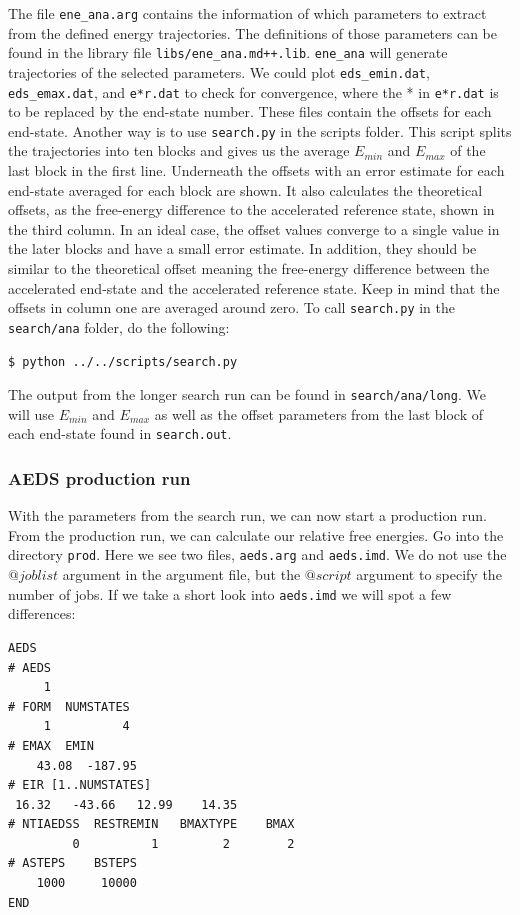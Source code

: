 The file \texttt{ene\_ana.arg} contains the information of which parameters to extract from the defined energy trajectories. The definitions of those parameters can be found in the library file \texttt{libs/ene\_ana.md++.lib}. \texttt{ene\_ana} will generate trajectories of the selected parameters. We could plot \texttt{eds\_emin.dat}, \texttt{eds\_emax.dat}, and \texttt{e*r.dat} to check for convergence, where the * in \texttt{e*r.dat} is to be replaced by the end-state number. These files contain the offsets for each end-state. Another way is to use \texttt{search.py} in the scripts folder. This script splits the trajectories into ten blocks and gives us the average $E_{min}$ and $E_{max}$ of the last block in the first line. Underneath the offsets with an error estimate for each end-state averaged for each block are shown. It also calculates the theoretical offsets, as the free-energy difference to the accelerated reference state, shown in the third column. In an ideal case, the offset values converge to a single value in the later blocks and have a small error estimate. In addition, they should be similar to the theoretical offset meaning the free-energy difference between the accelerated end-state and the accelerated reference state. Keep in mind that the offsets in column one are averaged around zero.
To call \texttt{search.py} in the \texttt{search/ana} folder, do the following:

\begin{lstlisting}
$ python ../../scripts/search.py
\end{lstlisting}

The output from the longer search run can be found in \texttt{search/ana/long}.
We will use $E_{min}$ and $E_{max}$ as well as the offset parameters from the last block of each end-state found in \texttt{search.out}.

\subsubsection{AEDS production run}
With the parameters from the search run, we can now start a production run. From the production run, we can calculate our relative free energies. Go into the directory \texttt{prod}. Here we see two files, \texttt{aeds.arg} and \texttt{aeds.imd}. We do not use the $@joblist$ argument in the argument file, but the $@script$ argument to specify the number of jobs. If we take a short look into \texttt{aeds.imd} we will spot a few differences:

\begin{lstlisting}
AEDS
# AEDS
     1
# FORM  NUMSTATES
     1          4
# EMAX  EMIN
    43.08  -187.95
# EIR [1..NUMSTATES]
 16.32   -43.66   12.99    14.35 
# NTIAEDSS  RESTREMIN   BMAXTYPE    BMAX   
         0          1         2        2      
# ASTEPS    BSTEPS
    1000     10000 
END
\end{lstlisting}

